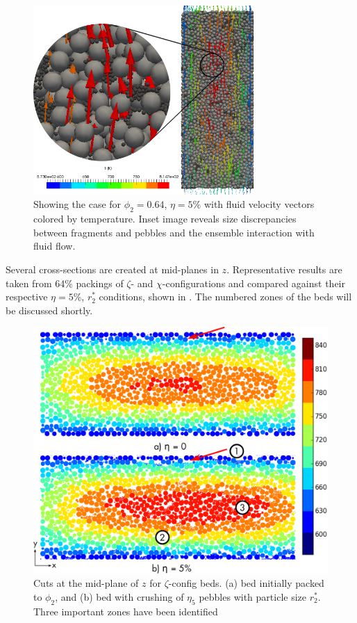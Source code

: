 \begin{figure}[!h]
    \centering
    \includegraphics[width = 0.75\textwidth]{figures/pebble_inset_2.png}
    \caption{Showing the case for $\phi_2 = 0.64$, $\eta = 5\%$ with fluid velocity vectors colored by temperature. Inset image reveals size discrepancies between fragments and pebbles and the ensemble interaction with fluid flow.}\label{fig:inset}
\end{figure}

Several cross-sections are created at mid-planes in $z$. Representative results are taken from 64\% packings of $\zeta$- and $\chi$-configurations and compared against their respective $\eta = 5\%$, $r_2^*$ conditions, shown in . The numbered zones of the beds will be discussed shortly.

\begin{figure}[!ht]
    \centering
    \includegraphics[width = \textwidth]{figures/z-64-discrete.eps}
    \caption{Cuts at the mid-plane of $z$ for $\zeta$-config beds. (a) bed initially packed to $\phi_2$, and (b) bed with crushing of $\eta_5$ pebbles with particle size $r_2^*$. Three important zones have been identified}\label{fig:1}
\end{figure}

